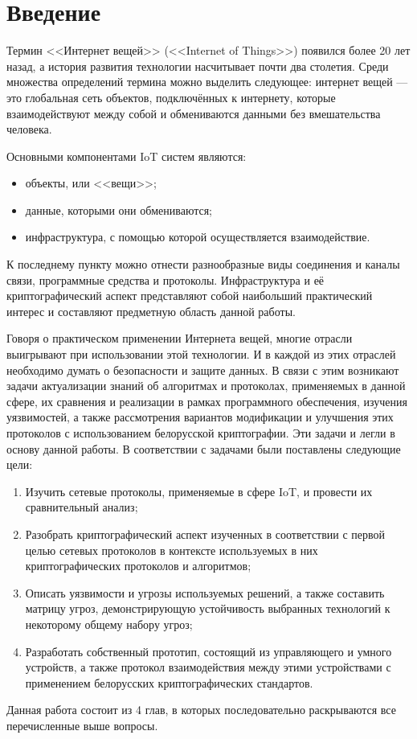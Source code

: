 \chapter*{Введение}
 
 	Термин <<Интернет вещей>> (<<Internet of Things>>) появился более 20 лет назад, а история развития
 	технологии насчитывает почти два столетия. Среди множества определений термина можно выделить
 	следующее: интернет вещей --- это глобальная сеть объектов, подключённых к интернету, которые 
 	взаимодействуют между собой и обмениваются данными без вмешательства человека.
 	
 	Основными компонентами IoT систем являются:
 	\begin{itemize}
 		\item объекты, или <<вещи>>;
 		\item данные, которыми они обмениваются;
 		\item инфраструктура, с помощью которой осуществляется взаимодействие.
 	\end{itemize}
 
 	К последнему пункту можно отнести разнообразные виды соединения и каналы связи, программные 
 	средства и протоколы. Инфраструктура и её криптографический аспект представляют собой наибольший
 	практический интерес и составляют предметную область данной работы.
 	
 	Говоря о практическом применении Интернета вещей, многие отрасли выигрывают при использовании
 	этой технологии. И в каждой из этих отраслей необходимо думать о безопасности и защите данных.
 	В связи с этим возникают задачи актуализации знаний об алгоритмах и протоколах, применяемых в
 	данной сфере, их сравнения и реализации в рамках программного обеспечения, 
 	изучения уязвимостей, а также рассмотрения
 	вариантов модификации и улучшения этих протоколов с использованием белорусской криптографии. Эти
 	задачи и легли в основу данной работы. В соответствии с задачами были поставлены следующие цели:
 	
 	\begin{enumerate}
 		\item Изучить сетевые протоколы, применяемые в сфере IoT, и провести их сравнительный анализ;
 		\item Разобрать криптографический аспект изученных в соответствии с первой целью сетевых 
 		протоколов в контексте используемых в них криптографических протоколов и алгоритмов;
 		\item Описать уязвимости и угрозы используемых решений, а также составить матрицу угроз,
 		демонстрирующую устойчивость выбранных технологий к некоторому общему набору угроз;
 		\item Разработать собственный прототип, состоящий из управляющего и умного устройств,
 		а также протокол взаимодействия между этими устройствами с применением белорусских 
 		криптографических стандартов.
 	\end{enumerate}
 	
 	Данная работа состоит из 4 глав, в которых последовательно раскрываются все перечисленные выше
 	вопросы.